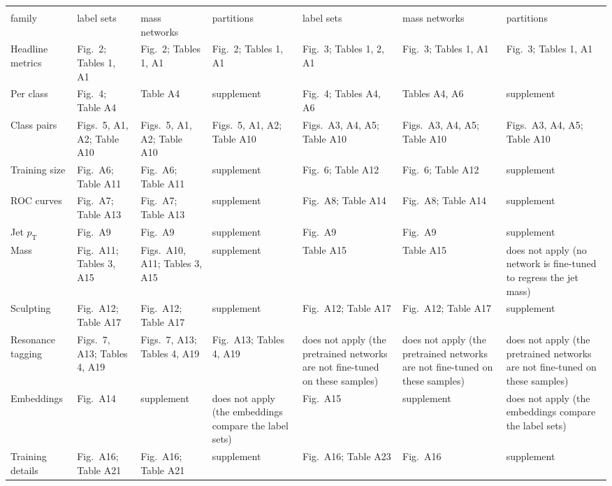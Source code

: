 \documentclass[12pt]{article}   %
\begin{document}
\begin{center}\scriptsize\setlength{\tabcolsep}{2.5pt}
\begin{tabular}{@{}>{\raggedright\arraybackslash}p{1.55cm}*{6}{>{\raggedright\arraybackslash}p{2.05cm}}@{}}
\toprule
 & \multicolumn{3}{c}{linear probe or frozen} & \multicolumn{3}{c}{fine-tuned} \\
\cmidrule(lr){2-4}\cmidrule(lr){5-7}
 family & label sets & mass networks & partitions & label sets & mass networks & partitions \\
\midrule
Headline metrics & Fig.~2; Tables 1, A1 & Fig.~2; Tables 1, A1 & Fig.~2; Tables 1, A1 & Fig.~3; Tables 1, 2, A1 & Fig.~3; Tables 1, A1 & Fig.~3; Tables 1, A1 \\
Per class & Fig.~4; Table A4 & Table A4 & supplement & Fig.~4; Tables A4, A6 & Tables A4, A6 & supplement \\
Class pairs & Figs.~5, A1, A2; Table A10 & Figs.~5, A1, A2; Table A10 & Figs.~5, A1, A2; Table A10 & Figs.~A3, A4, A5; Table A10 & Figs.~A3, A4, A5; Table A10 & Figs.~A3, A4, A5; Table A10 \\
Training size & Fig.~A6; Table A11 & Fig.~A6; Table A11 & supplement & Fig.~6; Table A12 & Fig.~6; Table A12 & supplement \\
ROC curves & Fig.~A7; Table A13 & Fig.~A7; Table A13 & supplement & Fig.~A8; Table A14 & Fig.~A8; Table A14 & supplement \\
Jet $p_{\mathrm{T}}$  & Fig.~A9 & Fig.~A9 & supplement & Fig.~A9 & Fig.~A9 & supplement \\
Mass & Fig.~A11; Tables 3, A15 & Figs.~A10, A11; Tables 3, A15 & supplement & Table A15 & Table A15 & does not apply (no network is fine-tuned to regress the jet mass) \\
Sculpting & Fig.~A12; Table A17 & Fig.~A12; Table A17 & supplement & Fig.~A12; Table A17 & Fig.~A12; Table A17 & supplement \\
Resonance tagging & Figs.~7, A13; Tables 4, A19 & Figs.~7, A13; Tables 4, A19 & Fig.~A13; Tables 4, A19 & does not apply (the pretrained networks are not fine-tuned on these samples) & does not apply (the pretrained networks are not fine-tuned on these samples) & does not apply (the pretrained networks are not fine-tuned on these samples) \\
Embeddings & Fig.~A14 & supplement & does not apply (the embeddings compare the label sets) & Fig.~A15 & supplement & does not apply (the embeddings compare the label sets) \\
Training details & Fig.~A16; Table A21 & Fig.~A16; Table A21 & supplement & Fig.~A16; Table A23 & Fig.~A16 & supplement \\
\bottomrule
\end{tabular}
\end{center}
\clearpage
\clearpage
\end{document}
